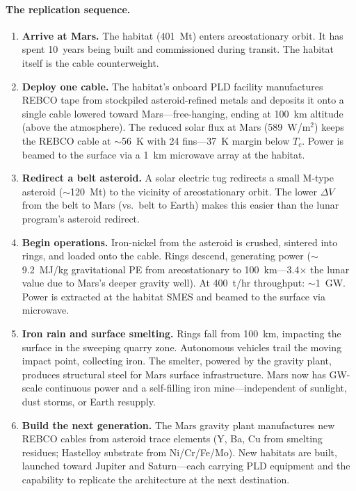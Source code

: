 \documentclass[12pt,letterpaper]{article}
\begin{document}
\paragraph{The replication sequence.}

\begin{enumerate}[label=\arabic*.]
\item \textbf{Arrive at Mars.} The habitat (401~Mt) enters areostationary orbit. It has spent 10~years being built and commissioned during transit. The habitat itself is the cable counterweight.

\item \textbf{Deploy one cable.} The habitat's onboard PLD facility manufactures REBCO tape from stockpiled asteroid-refined metals and deposits it onto a single cable lowered toward Mars---free-hanging, ending at 100~km altitude (above the atmosphere). The reduced solar flux at Mars (589~W/m$^2$) keeps the REBCO cable at ${\sim}$56~K with 24 fins---37~K margin below $T_c$. Power is beamed to the surface via a 1~km microwave array at the habitat.

\item \textbf{Redirect a belt asteroid.} A solar electric tug redirects a small M-type asteroid (${\sim}$120~Mt) to the vicinity of areostationary orbit. The lower $\Delta V$ from the belt to Mars (vs.\ belt to Earth) makes this easier than the lunar program's asteroid redirect.

\item \textbf{Begin operations.} Iron-nickel from the asteroid is crushed, sintered into rings, and loaded onto the cable. Rings descend, generating power (${\sim}$9.2~MJ/kg gravitational PE from areostationary to 100~km---3.4$\times$ the lunar value due to Mars's deeper gravity well). At 400~t/hr throughput: ${\sim}$1~GW. Power is extracted at the habitat SMES and beamed to the surface via microwave.

\item \textbf{Iron rain and surface smelting.} Rings fall from 100~km, impacting the surface in the sweeping quarry zone. Autonomous vehicles trail the moving impact point, collecting iron. The smelter, powered by the gravity plant, produces structural steel for Mars surface infrastructure. Mars now has GW-scale continuous power and a self-filling iron mine---independent of sunlight, dust storms, or Earth resupply.

\item \textbf{Build the next generation.} The Mars gravity plant manufactures new REBCO cables from asteroid trace elements (Y, Ba, Cu from smelting residues; Hastelloy substrate from Ni/Cr/Fe/Mo). New habitats are built, launched toward Jupiter and Saturn---each carrying PLD equipment and the capability to replicate the architecture at the next destination.
\end{enumerate}
\end{document}
